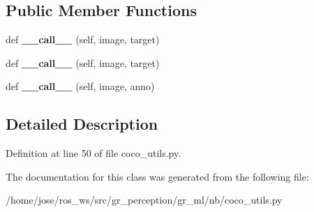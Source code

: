 \subsection*{Public Member Functions}
\begin{DoxyCompactItemize}
\item 
\mbox{\label{classcoco__utils_1_1ConvertCocoPolysToMask_a98039228bfc84317ca57425329bef3d2}} 
def {\bfseries \+\_\+\+\_\+call\+\_\+\+\_\+} (self, image, target)
\item 
\mbox{\label{classcoco__utils_1_1ConvertCocoPolysToMask_a98039228bfc84317ca57425329bef3d2}} 
def {\bfseries \+\_\+\+\_\+call\+\_\+\+\_\+} (self, image, target)
\item 
\mbox{\label{classcoco__utils_1_1ConvertCocoPolysToMask_a5bb17a82b1239e2c64725dbf8f972863}} 
def {\bfseries \+\_\+\+\_\+call\+\_\+\+\_\+} (self, image, anno)
\end{DoxyCompactItemize}


\subsection{Detailed Description}


Definition at line 50 of file coco\+\_\+utils.\+py.



The documentation for this class was generated from the following file\+:\begin{DoxyCompactItemize}
\item 
/home/jose/ros\+\_\+ws/src/gr\+\_\+perception/gr\+\_\+ml/nb/coco\+\_\+utils.\+py\end{DoxyCompactItemize}
